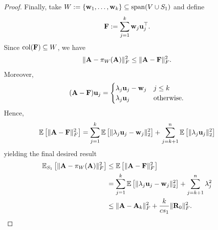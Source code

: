 \documentclass{article}
\begin{document}
\begin{proof}
    Finally, take $W := \{\mathbf{w}_1, \ldots, \mathbf{w}_k\}\subseteq \operatorname*{span}(V \cup S_1)$ and define
    \[\mathbf{F} := \sum_{j = 1}^k\mathbf{w}_j\mathbf{u}_j^\top.\]
    Since $\operatorname*{col}(\mathbf{F})\subseteq W$, we have
    \[\|\mathbf{A} - \pi_W(\mathbf{A})\|^2_F\leq \|\mathbf{A} - \mathbf{F}\|^2_F.\]
    Moreover, 
    \[(\mathbf{A} - \mathbf{F})\mathbf{u}_j = \begin{cases}
        \lambda_j\mathbf{u}_j - \mathbf{w}_j&j\leq k\\
        \lambda_j\mathbf{u}_j&\text{otherwise.}
    \end{cases}\]
    Hence,
    \[\mathbb{E}\left[\|\mathbf{A} - \mathbf{F}\|^2_F\right] = \sum_{j = 1}^k \mathbb{E}\left[\|\lambda_j\mathbf{u}_j - \mathbf{w}_j\|^2_2\right] + \sum_{j = k+1}^n \mathbb{E}\left[\|\lambda_j\mathbf{u}_j\|^2_2\right]\]
    yielding the final desired result
    \begin{align*}
        \mathbb{E}_{S_1}\left[\|\mathbf{A} - \pi_W(\mathbf{A})\|^2_F\right]&\leq \mathbb{E}\left[\|\mathbf{A} - \mathbf{F}\|^2_F\right]\\
        &= \sum_{j = 1}^k \mathbb{E}\left[\|\lambda_j\mathbf{u}_j - \mathbf{w}_j\|^2_2\right] + \sum_{j = k+1}^n \lambda_j^2\\
        &\leq \|\mathbf{A} - \mathbf{A}_k\|^2_F + \frac{k}{cs_1}\|\mathbf{R}_0\|^2_F.
    \end{align*}
\end{proof}
\end{document}
